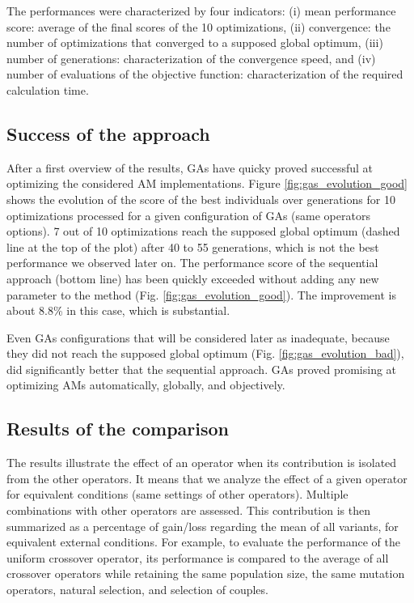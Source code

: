\documentclass{ametsoc}
\begin{document}
The performances were characterized by four indicators: (i) mean performance score: average of the final scores of the 10 optimizations, (ii) convergence: the number of optimizations that converged to a supposed global optimum, (iii) number of generations: characterization of the convergence speed, and (iv) number of evaluations of the objective function: characterization of the required calculation time.


\subsection{Success of the approach}

After a first overview of the results, GAs have quicky proved successful at optimizing the considered AM implementations. Figure \ref{fig:gas_evolution_good} shows the evolution of the score of the best individuals over generations for 10 optimizations processed for a given configuration of GAs (same operators options). 7 out of 10 optimizations reach the supposed global optimum (dashed line at the top of the plot) after 40 to 55 generations, which is not the best performance we observed later on. The performance score of the sequential approach (bottom line) has been quickly exceeded without adding any new parameter to the method (Fig. \ref{fig:gas_evolution_good}). The improvement is about 8.8\% in this case, which is substantial.

Even GAs configurations that will be considered later as inadequate, because they did not reach the supposed global optimum (Fig. \ref{fig:gas_evolution_bad}), did significantly better that the sequential approach. GAs proved promising at optimizing AMs automatically, globally, and objectively.


\subsection{Results of the comparison}
\label{sec:assessment:results}

The results illustrate the effect of an operator when its contribution is isolated from the other operators. It means that we analyze the effect of a given operator for equivalent conditions (same settings of other operators). Multiple combinations with other operators are assessed. This contribution is then summarized as a percentage of gain/loss regarding the mean of all variants, for equivalent external conditions. For example, to evaluate the performance of the uniform crossover operator, its performance is compared to the average of all crossover operators while retaining the same population size, the same mutation operators, natural selection, and selection of couples.
\end{document}
